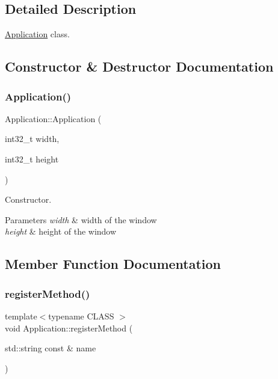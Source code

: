 \subsection{Detailed Description}
\hyperlink{classApplication}{Application} class. 

\subsection{Constructor \& Destructor Documentation}
\mbox{\label{classApplication_a00f1777a96159f25075927bbe9076696}} 
\subsubsection{\texorpdfstring{Application()}{Application()}}
{\footnotesize\ttfamily Application\+::\+Application (\begin{DoxyParamCaption}\item[{int32\+\_\+t}]{width,  }\item[{int32\+\_\+t}]{height }\end{DoxyParamCaption})}



Constructor. 


\begin{DoxyParams}{Parameters}
{\em width} & width of the window \\
\hline
{\em height} & height of the window \\
\hline
\end{DoxyParams}


\subsection{Member Function Documentation}
\mbox{\label{classApplication_a1ad1383c43c8d658761249d5a06e3a88}} 
\subsubsection{\texorpdfstring{register\+Method()}{registerMethod()}}
{\footnotesize\ttfamily template$<$typename C\+L\+A\+SS $>$ \\
void Application\+::register\+Method (\begin{DoxyParamCaption}\item[{std\+::string const \&}]{name }\end{DoxyParamCaption})}



